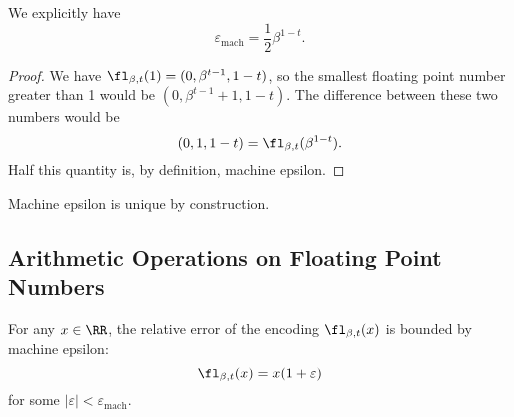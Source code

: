 \begin{thm}
  We explicitly have
  \begin{equation}
    \varepsilon_{\text{mach}} = \frac{1}{2}\beta^{1-t}.
  \end{equation}
\end{thm}
\begin{proof}
  We have $\fl_{\beta,t}(1) = (0,\beta^{t-1},1-t)$, so the smallest
  floating point number greater than 1 would be $(0,\beta^{t-1}+1,1-t)$.
  The difference between these two numbers would be
  \begin{equation}
  (0,1,1-t)=\fl_{\beta,t}(\beta^{1-t}).
  \end{equation}
  Half this quantity is, by definition, machine epsilon.
\end{proof}

\begin{rmk}
Machine epsilon is unique by construction.
\end{rmk}

\subsection{Arithmetic Operations on Floating Point Numbers}

\begin{prop}
For any $x\in\RR$, the relative error of the encoding $\fl_{\beta,t}(x)$
is bounded by machine epsilon:
\begin{equation}
  \fl_{\beta,t}(x) = x(1 + \varepsilon)
\end{equation}
for some $|\varepsilon|<\varepsilon_{\text{mach}}$.
\end{prop}

